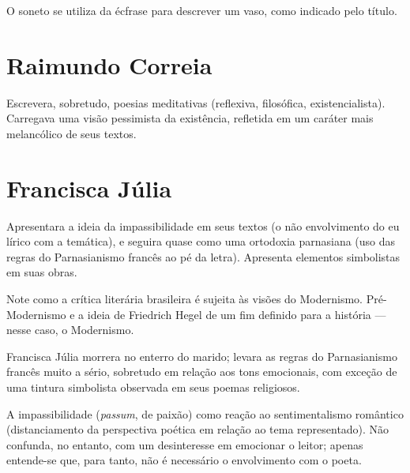 O soneto se utiliza da écfrase para descrever um vaso, como indicado pelo título.

\section{Raimundo Correia}

Escrevera, sobretudo, poesias meditativas (reflexiva, filosófica, existencialista). Carregava uma visão pessimista da existência, refletida em um caráter mais melancólico de seus textos.

\section{Francisca Júlia}

Apresentara a ideia da impassibilidade em seus textos (o não envolvimento do eu lírico com a temática), e seguira quase como uma ortodoxia parnasiana (uso das regras do Parnasianismo francês ao pé da letra). Apresenta elementos simbolistas em suas obras.

Note como a crítica literária brasileira é sujeita às visões do Modernismo. Pré-Modernismo e a ideia de Friedrich Hegel de um fim definido para a história — nesse caso, o Modernismo.

Francisca Júlia morrera no enterro do marido; levara as regras do Parnasianismo francês muito a sério, sobretudo em relação aos tons emocionais, com exceção de uma tintura simbolista observada em seus poemas religiosos.

A impassibilidade (\textit{passum}, de paixão) como reação ao sentimentalismo romântico (distanciamento da perspectiva poética em relação ao tema representado). Não confunda, no entanto, com um desinteresse em emocionar o leitor; apenas entende-se que, para tanto, não é necessário o envolvimento com o poeta.

